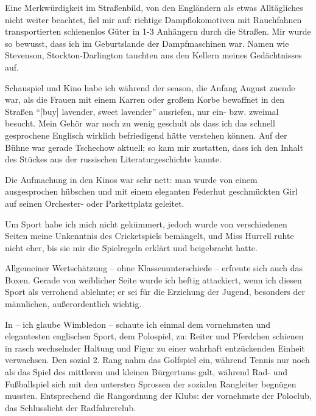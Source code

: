 \documentclass[a5paper,pagesize,10pt,twoside=true]{scrbook}
\renewcommand{\marginpar}[2][]{}
\begin{document}
Eine Merkwürdigkeit im Straßenbild, von den Engländern als etwas Alltägliches nicht weiter beachtet, fiel mir auf: richtige Dampflokomotiven mit Rauchfahnen transportierten schienenlos Güter in 1-3 Anhängern durch die Straßen. Mir wurde so bewusst, dass ich im Geburtslande der Dampfmaschinen war. Namen wie Stevenson, Stockton-Darlington tauchten aus den Kellern meines Gedächtnisses auf.

\marginpar{504}
Schauspiel und Kino habe ich während der season, die Anfang August zuende war, als die Frauen mit einem Karren oder großem Korbe bewaffnet in den Straßen \enquote{[buy] lavender, sweet lavender} ausriefen, nur ein- bzw. zweimal besucht. Mein Gehör war noch zu wenig geschult als dass ich das schnell gesprochene Englisch wirklich befriedigend hätte verstehen können. Auf der Bühne war gerade Tschechow aktuell; so kam mir zustatten, dass ich den Inhalt des Stückes aus der russischen Literaturgeschichte kannte.

Die Aufmachung in den Kinos war sehr nett: man wurde von einem ausgesprochen hübschen und mit einem eleganten Federhut geschmückten Girl auf seinen Orchester- oder Parkettplatz geleitet.

Um Sport habe ich mich nicht gekümmert, jedoch wurde von verschiedenen Seiten meine Unkenntnis des Cricketspiels bemängelt, und Miss Hurrell ruhte nicht eher, bis sie mir die Spielregeln erklärt und beigebracht hatte.

Allgemeiner Wertschätzung -- ohne Klassenunterschiede -- erfreute sich auch das Boxen. Gerade von weiblicher Seite wurde ich heftig attackiert, wenn ich diesen Sport als verrohend ablehnte; er sei für die Erziehung der Jugend, besonders der männlichen, außerordentlich wichtig.

In -- ich glaube Wimbledon -- schaute ich einmal dem vornehmsten und elegantesten englischen Sport, dem Polospiel, zu: Reiter und Pferdchen schienen in rasch wechselnder Haltung und Figur zu einer wahrhaft entzückenden Einheit verwachsen. Den sozial 2. Rang nahm das Golfspiel ein, während Tennis nur noch als das Spiel des mittleren und kleinen Bürgertums galt, während Rad- und Fußballspiel sich mit den untersten Sprossen der sozialen Rangleiter begnügen mussten. Entsprechend die Rangordnung der Klubs: der vornehmste der Poloclub, das Schlusslicht der Radfahrerclub.
\end{document}
